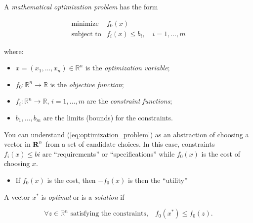 


A \textit{mathematical optimization problem} has the form

\begin{equation}\label{eq:opt_problem}
  \begin{array}{rl}
    \text{minimize} & f_0(x) \\ \text{subject to} & f_i(x)\le b_i,\quad i=1,\ldots,m
  \end{array}
\end{equation}

where:

\begin{itemize}
\item $x=(x_1,\ldots,x_n)\in\mathbb R^n$ is the \textit{optimization variable};
\item $f_0:\mathbb R^n\to\mathbb R$ is the \textit{objective function};
\item $f_i:\mathbb R^n\to \mathbb R$, $i=1,\ldots,m$ are the \textit{constraint
    functions};
\item $b_1,...,b_m$ are the limits (bounds) for the constraints.
\end{itemize}

\begin{Fact}
  You can understand (\ref{eq:optimization_problem}) as an abstraction of
  choosing a vector in $\textbf{R}^n$ from a set of candidate choices. In this case,
  constraints $f_i(x)\le bi$ are ``requirements'' or ``specifications'' while
  $f_0(x)$ is the cost of choosing $x$.

  \begin{itemize}
  \item If $f_0(x)$ is the cost, then $-f_0(x)$ is then the ``utility''
  \end{itemize}
\end{Fact}

\begin{Definition}
  A vector $x^*$ is \textit{optimal} or is a \textit{solution} if

  \begin{equation*}
    \forall z\in\mathbb R^n\text{ satisfying the constraints,}\quad f_0(x^*)\le f_0(z).
  \end{equation*}
\end{Definition}



